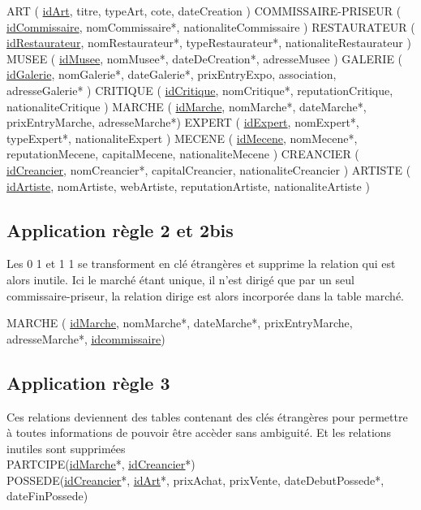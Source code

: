 \documentclass{article}
\begin{document}
ART ( \underline{idArt}, titre, typeArt, cote, dateCreation ) \newline
COMMISSAIRE-PRISEUR ( \underline{idCommissaire}, nomCommissaire*, nationaliteCommissaire )\newline
RESTAURATEUR ( \underline{idRestaurateur}, nomRestaurateur*, typeRestaurateur*, nationaliteRestaurateur )\newline
MUSEE ( \underline{idMusee}, nomMusee*, dateDeCreation*, adresseMusee )\newline
GALERIE ( \underline{idGalerie}, nomGalerie*, dateGalerie*, prixEntryExpo, association, adresseGalerie* )\newline
CRITIQUE ( \underline{idCritique}, nomCritique*, reputationCritique, nationaliteCritique )\newline
MARCHE ( \underline{idMarche}, nomMarche*, dateMarche*, prixEntryMarche, adresseMarche*)\newline
EXPERT ( \underline{idExpert}, nomExpert*, typeExpert*, nationaliteExpert )\newline
MECENE ( \underline{idMecene}, nomMecene*, reputationMecene, capitalMecene, nationaliteMecene )\newline
CREANCIER ( \underline{idCreancier}, nomCreancier*, capitalCreancier, nationaliteCreancier )\newline
ARTISTE ( \underline{idArtiste}, nomArtiste, webArtiste, reputationArtiste, nationaliteArtiste )\newline

\subsection{Application règle 2 et 2bis}

Les 0 1 et 1 1 se transforment en clé étrangères et supprime la relation qui est alors inutile.
Ici le marché étant unique, il n'est dirigé que par un seul commissaire-priseur, la relation dirige est alors incorporée dans la table marché.

MARCHE ( \underline{idMarche}, nomMarche*, dateMarche*, prixEntryMarche, adresseMarche*, \underline{\underline{idcommissaire}})

\subsection{Application règle 3}

Ces relations deviennent des tables contenant des clés étrangères pour permettre à toutes informations de pouvoir être accèder sans ambiguité.
Et les relations inutiles sont supprimées 
\\
PARTCIPE(\underline{\underline{idMarche}}*, \underline{\underline{idCreancier}}*)
\\
POSSEDE(\underline{\underline{idCreancier}}*, \underline{\underline{idArt}}*, prixAchat, prixVente, dateDebutPossede*, dateFinPossede) \newline
\end{document}
